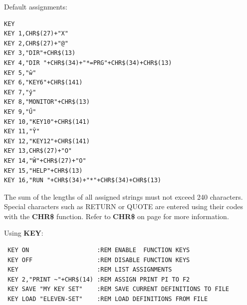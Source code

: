 \begin{description}[leftmargin=2cm,style=nextline]
               Default assignments:

\begin{tcolorbox}[colback=black,coltext=white]
\verbatimfont{\codefont}
\begin{verbatim}
KEY
KEY 1,CHR$(27)+"X"
KEY 2,CHR$(27)+"@"
KEY 3,"DIR"+CHR$(13)
KEY 4,"DIR "+CHR$(34)+"*=PRG"+CHR$(34)+CHR$(13)
KEY 5,"ŵ"
KEY 6,"KEY6"+CHR$(141)
KEY 7,"ŷ"
KEY 8,"MONITOR"+CHR$(13)
KEY 9,"Ű"
KEY 10,"KEY10"+CHR$(141)
KEY 11,"Ŷ"
KEY 12,"KEY12"+CHR$(141)
KEY 13,CHR$(27)+"O"
KEY 14,"Ŵ"+CHR$(27)+"O"
KEY 15,"HELP"+CHR$(13)
KEY 16,"RUN "+CHR$(34)+"*"+CHR$(34)+CHR$(13)
\end{verbatim}
\end{tcolorbox}

\item [Remarks:] The sum of the lengths of all assigned strings
                 must not exceed 240 characters.
                 Special characters such as RETURN or QUOTE are entered
                 using their codes with the {\bf CHR\$} function.
                 Refer to {\bf CHR\$} on page \pageref{BASIC 65 Functions!CHR}
                 for more information.

\item [Examples:] Using {\bf KEY}:
\begin{tcolorbox}[colback=black,coltext=white]
\verbatimfont{\codefont}
\begin{verbatim}
 KEY ON                   :REM ENABLE  FUNCTION KEYS
 KEY OFF                  :REM DISABLE FUNCTION KEYS
 KEY                      :REM LIST ASSIGNMENTS
 KEY 2,"PRINT ~"+CHR$(14) :REM ASSIGN PRINT PI TO F2
 KEY SAVE "MY KEY SET"    :REM SAVE CURRENT DEFINITIONS TO FILE
 KEY LOAD "ELEVEN-SET"    :REM LOAD DEFINITIONS FROM FILE
\end{verbatim}
\end{tcolorbox}
\end{description}


\newpage
